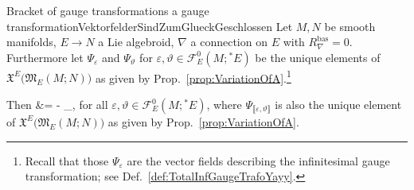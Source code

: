 \documentclass[CM,GP]{degruyter-crelle}       %
\def\ba#1\ea{\begin{align}#1\end{align}}
\theoremstyle{plain}
\theoremstyle{remark}
\theoremstyle{definition}
\begin{document}
\begin{theorems}{Bracket of gauge transformations a gauge transformation}{VektorfelderSindZumGlueckGeschlossen}
Let $M, N$ be smooth manifolds, $E \to N$ a Lie algebroid, $\nabla$ a connection on $E$ with $R^{\mathrm{bas}}_\nabla=0$. Furthermore let $\Psi_\varepsilon$ and $\Psi_\vartheta$ for $\varepsilon, \vartheta \in \mathcal{F}^0_E(M; {}^*E)$ be the unique elements of $\mathfrak{X}^E\bigl( \mathfrak{M}_E(M;N) \bigr)$ as given by Prop.~\ref{prop:VariationOfA}.\footnote{Recall that those $\Psi_\varepsilon$ are the vector fields describing the infinitesimal gauge transformation; see Def.~\ref{def:TotalInfGaugeTrafoYayy}.}

Then
\ba
\mleft[ \Psi_\varepsilon, \Psi_\vartheta \mright]
&=
- \Psi_{\llbracket\varepsilon, \vartheta \rrbracket}
\ea
for all $\varepsilon, \vartheta \in \mathcal{F}^0_E(M; {}^*E)$, where $\Psi_{\llbracket\varepsilon, \vartheta\rrbracket}$ is also the unique element of $\mathfrak{X}^E\bigl( \mathfrak{M}_E(M;N) \bigr)$ as given by Prop.~\ref{prop:VariationOfA}.
\end{theorems}
\end{document}
